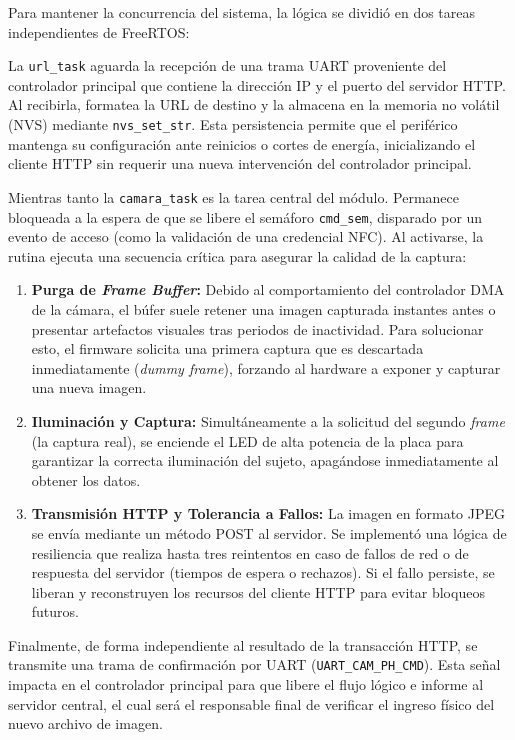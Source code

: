 Para mantener la concurrencia del sistema, la lógica se dividió en dos tareas independientes de FreeRTOS:

La \texttt{url\_task} aguarda la recepción de una trama UART proveniente del controlador principal que contiene la dirección IP y el puerto del servidor HTTP. Al recibirla, formatea la URL de destino y la almacena en la memoria no volátil (NVS) mediante \texttt{nvs\_set\_str}. Esta persistencia permite que el periférico mantenga su configuración ante reinicios o cortes de energía, inicializando el cliente HTTP sin requerir una nueva intervención del controlador principal.

Mientras tanto la \texttt{camara\_task} es la tarea central del módulo. Permanece bloqueada a la espera de que se libere el semáforo \texttt{cmd\_sem}, disparado por un evento de acceso (como la validación de una credencial NFC). Al activarse, la rutina ejecuta una secuencia crítica para asegurar la calidad de la captura:

\begin{enumerate}
    \item \textbf{Purga de \textit{Frame Buffer}:} Debido al comportamiento del controlador DMA de la cámara, el búfer suele retener una imagen capturada instantes antes o presentar artefactos visuales tras periodos de inactividad. Para solucionar esto, el firmware solicita una primera captura que es descartada inmediatamente (\textit{dummy frame}), forzando al hardware a exponer y capturar una nueva imagen.
    \item \textbf{Iluminación y Captura:} Simultáneamente a la solicitud del segundo \textit{frame} (la captura real), se enciende el LED de alta potencia de la placa para garantizar la correcta iluminación del sujeto, apagándose inmediatamente al obtener los datos.
    \item \textbf{Transmisión HTTP y Tolerancia a Fallos:} La imagen en formato JPEG se envía mediante un método POST al servidor. Se implementó una lógica de resiliencia que realiza hasta tres reintentos en caso de fallos de red o de respuesta del servidor (tiempos de espera o rechazos). Si el fallo persiste, se liberan y reconstruyen los recursos del cliente HTTP para evitar bloqueos futuros.
\end{enumerate}

Finalmente, de forma independiente al resultado de la transacción HTTP, se transmite una trama de confirmación por UART (\texttt{UART\_CAM\_PH\_CMD}). Esta señal impacta en el controlador principal para que libere el flujo lógico e informe al servidor central, el cual será el responsable final de verificar el ingreso físico del nuevo archivo de imagen.
